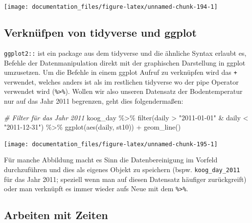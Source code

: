 \documentclass[
]{article}
\newenvironment{Shaded}{\begin{snugshade}}{\end{snugshade}}
\newcommand{\CommentTok}[1]{\textcolor[rgb]{0.56,0.35,0.01}{\textit{#1}}}
\newcommand{\FunctionTok}[1]{\textcolor[rgb]{0.00,0.00,0.00}{#1}}
\newcommand{\NormalTok}[1]{#1}
\newcommand{\SpecialCharTok}[1]{\textcolor[rgb]{0.00,0.00,0.00}{#1}}
\newcommand{\StringTok}[1]{\textcolor[rgb]{0.31,0.60,0.02}{#1}}
\begin{document}
\begin{center}\texttt{[image: documentation\_files/figure-latex/unnamed-chunk-194-1]} \end{center}

\hypertarget{verknuxfcfpen-von-tidyverse-und-ggplot}{%
\subsection{Verknüfpen von tidyverse und ggplot}\label{verknuxfcfpen-von-tidyverse-und-ggplot}}

\texttt{ggplot2::} ist ein package aus dem tidyverse und die ähnliche Syntax erlaubt es, Befehle der Datenmanipulation direkt mit der graphischen Darstellung in ggplot umzusetzen. Um die Befehle in einem ggplot Aufruf zu verknüpfen wird das \texttt{+} verwendet, welches anders ist als im restlichen tidyverse wo der pipe Operator verwendet wird (\texttt{\%\textgreater{}\%}). Wollen wir also unseren Datensatz der Bodentemperatur nur auf das Jahr 2011 begrenzen, geht dies folgendermaßen:

\begin{Shaded}
\begin{Highlighting}[]
\CommentTok{\# Filter für das Jahr 2011}
\NormalTok{koog\_day }\SpecialCharTok{\%\textgreater{}\%}
  \FunctionTok{filter}\NormalTok{(daily }\SpecialCharTok{\textgreater{}} \StringTok{"2011{-}01{-}01"} \SpecialCharTok{\&}\NormalTok{ daily }\SpecialCharTok{\textless{}} \StringTok{"2011{-}12{-}31"}\NormalTok{) }\SpecialCharTok{\%\textgreater{}\%}
  \FunctionTok{ggplot}\NormalTok{(}\FunctionTok{aes}\NormalTok{(daily, st10)) }\SpecialCharTok{+}
  \FunctionTok{geom\_line}\NormalTok{()}
\end{Highlighting}
\end{Shaded}

\begin{center}\texttt{[image: documentation\_files/figure-latex/unnamed-chunk-195-1]} \end{center}

Für manche Abbildung macht es Sinn die Datenbereinigung im Vorfeld durchzuführen und dies als eigenes Objekt zu speichern (bspw. \texttt{koog\_day\_2011} für das Jahr 2011; speziell wenn man auf diesen Datensatz häufiger zurückgreift) oder man verknüpft es immer wieder aufs Neue mit dem \texttt{\%\textgreater{}\%}.

\hypertarget{arbeiten-mit-zeiten-1}{%
\subsection{Arbeiten mit Zeiten}\label{arbeiten-mit-zeiten-1}}
\end{document}
